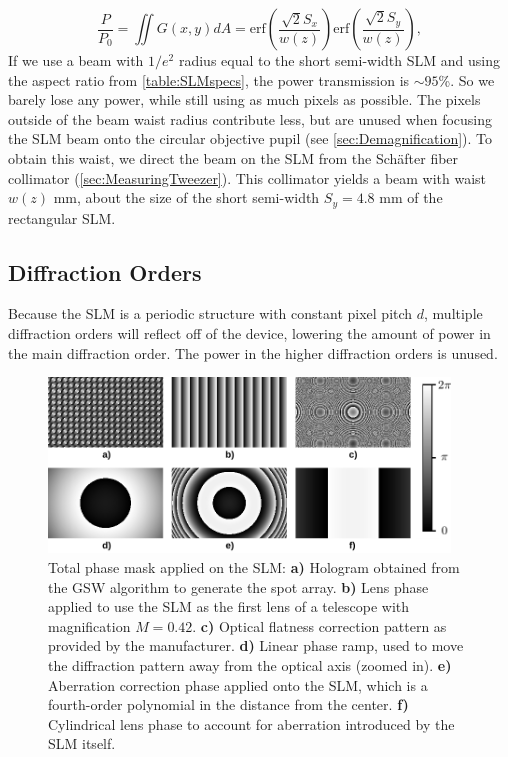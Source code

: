 \begin{equation}\label{eq:RectAperturePower}
	\frac{P}{P_0} =
	\iint G(x,y) dA=
	\text{erf}\left(\frac{\sqrt{2}S_x}{w(z)}\right) \text{erf}\left(\frac{\sqrt{2}S_y}{w(z)}\right),
\end{equation}
If we use a beam with $1/e^2$ radius equal to the short semi-width SLM and using the aspect ratio from \cref{table:SLMspecs}, the power transmission is $\sim 95$\%.
So we barely lose any power, while still using as much pixels as possible.
The pixels outside of the beam waist radius contribute less, but are unused when focusing the SLM beam onto the circular objective pupil (see \cref{sec:Demagnification}).
To obtain this waist, we direct the beam on the SLM from the Schäfter fiber collimator (\cref{sec:MeasuringTweezer}).
This collimator yields a beam with waist $w(z)$ mm, about the size of the short semi-width $S_y = 4.8$ mm of the rectangular SLM.




\subsection{Diffraction Orders}\label{subsec:Diffraction}

Because the SLM is a periodic structure with constant pixel pitch $d$, multiple diffraction orders will reflect off of the device, lowering the amount of power in the main diffraction order.
The power in the higher diffraction orders is unused. 

\begin{figure}
	\centering
	\includegraphics[width=0.95\textwidth]{figures/hologram.png}
	\caption{
		Total phase mask applied on the SLM: \textsf{\textbf{a)}} Hologram obtained from the \ac{GSW} algorithm to generate the spot array.
		\textsf{\textbf{b)}} Lens phase applied to use the SLM as the first lens of a telescope with magnification $M=0.42$.
		\textsf{\textbf{c)}} Optical flatness correction pattern as provided by the manufacturer.
		\textsf{\textbf{d)}} Linear phase ramp, used to move the diffraction pattern away from the optical axis (zoomed in).
		\textsf{\textbf{e)}} Aberration correction phase applied onto the SLM, which is a fourth-order polynomial in the distance from the center.
		\textsf{\textbf{f)}} Cylindrical lens phase to account for aberration introduced by the SLM itself.
	}
	\label{fig:SLMphase}
\end{figure}


